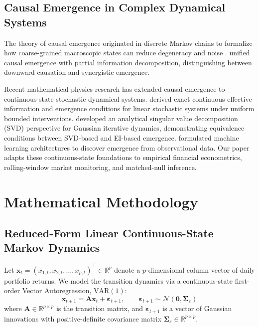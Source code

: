 \documentclass[review,12pt,authoryear]{elsarticle}
\begin{document}
\subsection{Causal Emergence in Complex Dynamical Systems}
The theory of causal emergence originated in discrete Markov chains to formalize how coarse-grained macroscopic states can reduce degeneracy and noise \citep{hoel2013quantifying, hoel2017when, klein2020emergence}. \citet{rosas2020reconciling} unified causal emergence with partial information decomposition, distinguishing between downward causation and synergistic emergence.

Recent mathematical physics research has extended causal emergence to continuous-state stochastic dynamical systems. \citet{liu2024exact} derived exact continuous effective information and emergence conditions for linear stochastic systems under uniform bounded interventions. \citet{liu2025singular} developed an analytical singular value decomposition (SVD) perspective for Gaussian iterative dynamics, demonstrating equivalence conditions between SVD-based and EI-based emergence. \citet{yang2025finding} formulated machine learning architectures to discover emergence from observational data. Our paper adapts these continuous-state foundations to empirical financial econometrics, rolling-window market monitoring, and matched-null inference.

\section{Mathematical Methodology}
\label{sec:methodology}

\subsection{Reduced-Form Linear Continuous-State Markov Dynamics}
Let $\mathbf{x}_t = (x_{1,t}, x_{2,t}, \dots, x_{p,t})^\top \in \mathbb{R}^p$ denote a $p$-dimensional column vector of daily portfolio returns. We model the transition dynamics via a continuous-state first-order Vector Autoregression, $\text{VAR}(1)$:
\begin{equation}
\mathbf{x}_{t+1} = \mathbf{A}\mathbf{x}_t + \boldsymbol{\varepsilon}_{t+1}, \qquad \boldsymbol{\varepsilon}_{t+1} \sim \mathcal{N}(\mathbf{0}, \boldsymbol{\Sigma}_\varepsilon)
\label{eq:var1_model}
\end{equation}
where $\mathbf{A} \in \mathbb{R}^{p \times p}$ is the transition matrix, and $\boldsymbol{\varepsilon}_{t+1}$ is a vector of Gaussian innovations with positive-definite covariance matrix $\boldsymbol{\Sigma}_\varepsilon \in \mathbb{R}^{p \times p}$. 
\end{document}
